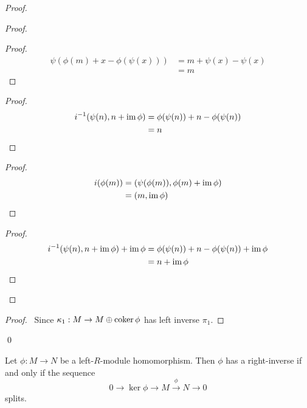 \begin{proof}
\pf
{}
\begin{proof}
	\begin{proof}
		\pf
		\begin{align*}
			\psi(\phi(m) + x - \phi(\psi(x))) & = m + \psi(x) - \psi(x) \\
			& = m
		\end{align*}
	\end{proof}
	\begin{proof}
		\pf
		\begin{align*}
			{i}^{-1}(\psi(n), n + \operatorname{im} \phi)
			& = \phi(\psi(n)) + n - \phi(\psi(n)) \\
			& = n
		\end{align*}
	\end{proof}
	\begin{proof}
		\pf
		\begin{align*}
			i(\phi(m)) & = (\psi(\phi(m)), \phi(m) + \operatorname{im} \phi) \\
			& = (m, \operatorname{im} \phi)
		\end{align*}
	\end{proof}
	\begin{proof}
		\pf
		\begin{align*}
			{i}^{-1}(\psi(n), n + \operatorname{im} \phi) + \operatorname{im} \phi
			& = \phi(\psi(n)) + n - \phi(\psi(n)) + \operatorname{im} \phi \\
			& = n + \operatorname{im} \phi
		\end{align*}
	\end{proof}
\end{proof}
\begin{proof}
	\pf\ Since $\kappa_1 : M \rightarrow M \oplus \operatorname{coker} \phi$ has left inverse $\pi_1$.
\end{proof}
\qed
\end{proof}

\begin{prop}
Let $\phi : M \rightarrow N$ be a left-$R$-module homomorphism. Then $\phi$ has a right-inverse if and only if the sequence
\[ 0 \rightarrow \ker \phi \rightarrow M \stackrel{\phi}{\rightarrow} N \rightarrow 0 \]
splits.
\end{prop}

